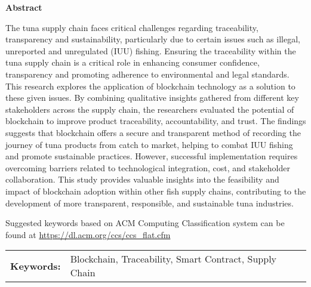 \begin{center}
\textbf{Abstract}
\end{center}
\setlength{\parindent}{0pt}
The tuna supply chain faces critical challenges regarding traceability, transparency and sustainability, particularly due to certain issues such as illegal, unreported and unregulated (IUU) fishing. Ensuring the traceability within the tuna supply chain is a critical role in enhancing consumer confidence, transparency and promoting adherence to environmental and legal standards. This research explores the application of blockchain technology as a solution to these given issues. By combining qualitative insights gathered from different key stakeholders across the supply chain, the researchers evaluated the potential of blockchain to improve product traceability, accountability, and trust. The findings suggests that blockchain offers a secure and transparent method of recording the journey of tuna products from catch to market, helping to combat IUU fishing and promote sustainable practices. However, successful implementation requires overcoming barriers related to technological integration, cost, and stakeholder collaboration. This study provides valuable insights into the feasibility and impact of blockchain adoption within other fish supply chains, contributing to the development of more transparent, responsible, and sustainable tuna industries.


Suggested keywords based on ACM Computing Classification system can be found at \url{https://dl.acm.org/ccs/ccs_flat.cfm}

\begin{tabular}{lp{4.25in}}
\hspace{-0.5em}\textbf{Keywords:}\hspace{0.25em} & Blockchain, Traceability, Smart Contract, Supply Chain\\
\end{tabular}
